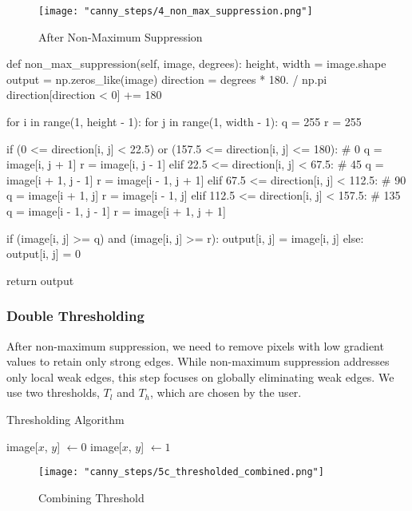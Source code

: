 \documentclass{article}
\begin{document}
	\begin{figure}[H]
		\centering
		\texttt{[image: "canny\_steps/4\_non\_max\_suppression.png"]}
		\caption{After Non-Maximum Suppression}
	\end{figure}
	
	\begin{python}
def non_max_suppression(self, image, degrees):
	height, width = image.shape
	output = np.zeros_like(image)
	direction = degrees * 180. / np.pi
	direction[direction < 0] += 180
	
	for i in range(1, height - 1):
		for j in range(1, width - 1):
			q = 255
			r = 255
			
			if (0 <= direction[i, j] < 22.5) or 
				(157.5 <= direction[i, j] <= 180):  # 0	
				q = image[i, j + 1]
				r = image[i, j - 1]
			elif 22.5 <= direction[i, j] < 67.5:  # 45 
				q = image[i + 1, j - 1]
				r = image[i - 1, j + 1]
			elif 67.5 <= direction[i, j] < 112.5:  # 90
				q = image[i + 1, j]
				r = image[i - 1, j]
			elif 112.5 <= direction[i, j] < 157.5:  # 135
				q = image[i - 1, j - 1]
				r = image[i + 1, j + 1]
			
			if (image[i, j] >= q) and (image[i, j] >= r):
				output[i, j] = image[i, j]
			else:
				output[i, j] = 0
		
	return output\end{python}
	
	\subsubsection{Double Thresholding}
	
	After non-maximum suppression, we need to remove pixels with low gradient values to retain only strong edges. While non-maximum suppression addresses only local weak edges, this step focuses on globally eliminating weak edges. We use two thresholds, $T_l$ and $T_h$, which are chosen by the user.
	
	\begin{algorithm}
		\caption{Thresholding Algorithm}
		\begin{algorithmic}[1]
			\State image[$x$, $y$] $\gets 0$
			\State image[$x$, $y$] $\gets 1$
			\EndIf
			\EndFor
		\end{algorithmic}
	\end{algorithm}

	\begin{figure}[H]
		\centering
		\texttt{[image: "canny\_steps/5c\_thresholded\_combined.png"]}
		\caption{Combining Threshold}
	\end{figure}
\end{document}
